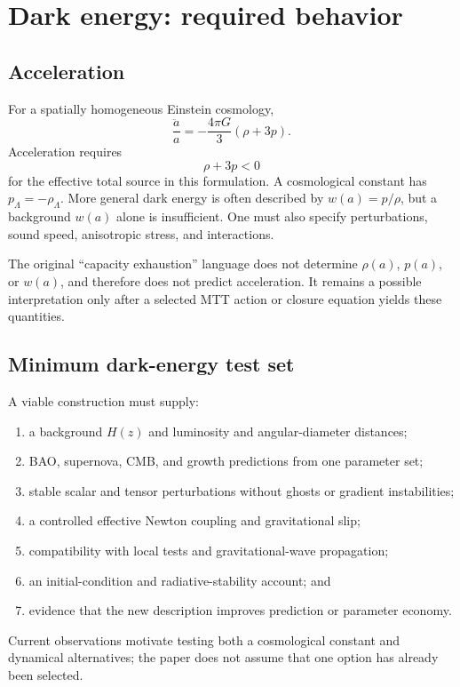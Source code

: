 \documentclass[11pt]{article}
\begin{document}
\section{Dark energy: required behavior}

\subsection{Acceleration}

For a spatially homogeneous Einstein cosmology,
\[
 \frac{\ddot a}{a}
 =-\frac{4\pi G}{3}\left(\rho+3p\right).
\]
Acceleration requires
\[
 \rho+3p<0
\]
for the effective total source in this formulation. A cosmological constant
has \(p_\Lambda=-\rho_\Lambda\). More general dark energy is often described
by \(w(a)=p/\rho\), but a background \(w(a)\) alone is insufficient. One must
also specify perturbations, sound speed, anisotropic stress, and interactions.

The original ``capacity exhaustion'' language does not determine
\(\rho(a)\), \(p(a)\), or \(w(a)\), and therefore does not predict
acceleration. It remains a possible interpretation only after a selected
MTT action or closure equation yields these quantities.

\subsection{Minimum dark-energy test set}

A viable construction must supply:
\begin{enumerate}[leftmargin=*]
\item a background \(H(z)\) and luminosity and angular-diameter distances;
\item BAO, supernova, CMB, and growth predictions from one parameter set;
\item stable scalar and tensor perturbations without ghosts or gradient
instabilities;
\item a controlled effective Newton coupling and gravitational slip;
\item compatibility with local tests and gravitational-wave propagation;
\item an initial-condition and radiative-stability account; and
\item evidence that the new description improves prediction or parameter
economy.
\end{enumerate}
Current observations motivate testing both a cosmological constant and
dynamical alternatives; the paper does not assume that one option has
already been selected.
\end{document}

